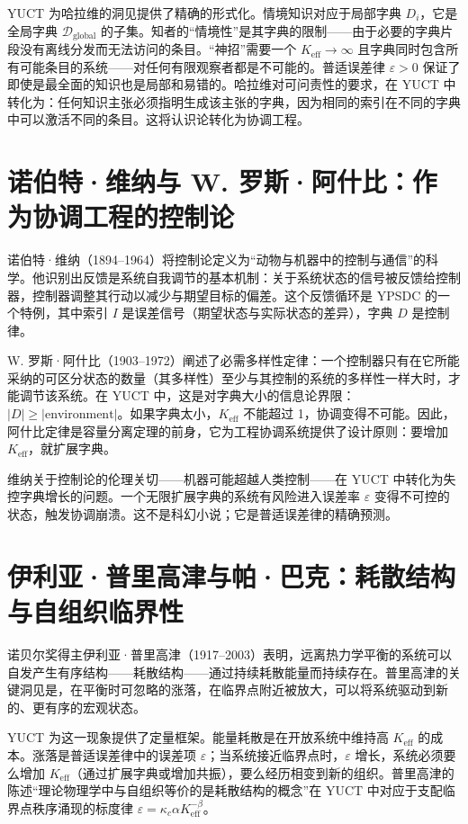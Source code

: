\documentclass[12pt,a4paper]{article}
\begin{document}
	YUCT 为哈拉维的洞见提供了精确的形式化。情境知识对应于局部字典 \(D_i\)，它是全局字典 \(\mathcal{D}_{\text{global}}\) 的子集。知者的“情境性”是其字典的限制——由于必要的字典片段没有离线分发而无法访问的条目。“神招”需要一个 \(K_{\mathrm{eff}} \to \infty\) 且字典同时包含所有可能条目的系统——对任何有限观察者都是不可能的。普适误差律 \(\varepsilon > 0\) 保证了即使是最全面的知识也是局部和易错的。哈拉维对可问责性的要求，在 YUCT 中转化为：任何知识主张必须指明生成该主张的字典，因为相同的索引在不同的字典中可以激活不同的条目。这将认识论转化为协调工程。
	
	\section{诺伯特·维纳与 W. 罗斯·阿什比：作为协调工程的控制论}
	
	诺伯特·维纳（1894–1964）将控制论定义为“动物与机器中的控制与通信”的科学。他识别出反馈是系统自我调节的基本机制：关于系统状态的信号被反馈给控制器，控制器调整其行动以减少与期望目标的偏差。这个反馈循环是 YPSDC 的一个特例，其中索引 \(I\) 是误差信号（期望状态与实际状态的差异），字典 \(D\) 是控制律。
	
	W. 罗斯·阿什比（1903–1972）阐述了必需多样性定律：一个控制器只有在它所能采纳的可区分状态的数量（其多样性）至少与其控制的系统的多样性一样大时，才能调节该系统。在 YUCT 中，这是对字典大小的信息论界限：\(|D| \ge |\text{environment}|\)。如果字典太小，\(K_{\mathrm{eff}}\) 不能超过 1，协调变得不可能。因此，阿什比定律是容量分离定理的前身，它为工程协调系统提供了设计原则：要增加 \(K_{\mathrm{eff}}\)，就扩展字典。
	
	维纳关于控制论的伦理关切——机器可能超越人类控制——在 YUCT 中转化为失控字典增长的问题。一个无限扩展字典的系统有风险进入误差率 \(\varepsilon\) 变得不可控的状态，触发协调崩溃。这不是科幻小说；它是普适误差律的精确预测。
	
	\section{伊利亚·普里高津与帕·巴克：耗散结构与自组织临界性}
	
	诺贝尔奖得主伊利亚·普里高津（1917–2003）表明，远离热力学平衡的系统可以自发产生有序结构——耗散结构——通过持续耗散能量而持续存在。普里高津的关键洞见是，在平衡时可忽略的涨落，在临界点附近被放大，可以将系统驱动到新的、更有序的宏观状态。
	
	YUCT 为这一现象提供了定量框架。能量耗散是在开放系统中维持高 \(K_{\mathrm{eff}}\) 的成本。涨落是普适误差律中的误差项 \(\varepsilon\)；当系统接近临界点时，\(\varepsilon\) 增长，系统必须要么增加 \(K_{\mathrm{eff}}\)（通过扩展字典或增加共振），要么经历相变到新的组织。普里高津的陈述“理论物理学中与自组织等价的是耗散结构的概念”在 YUCT 中对应于支配临界点秩序涌现的标度律 \(\varepsilon = \kappa_c \alpha K_{\mathrm{eff}}^{-\beta}\)。
	
\end{document}
